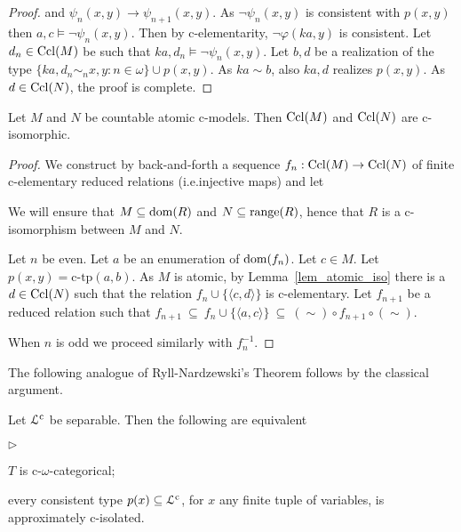 \documentclass{amsproc}
\newcommand{\mylabel}[1]{{#1}\hfill}
\renewenvironment{itemize}
  {\begin{list}{$\triangleright$}{%
  \setlength{\parskip}{0mm}
  \setlength{\topsep}{.4\baselineskip}
  \setlength{\rightmargin}{0mm}
  \setlength{\listparindent}{0mm}
  \setlength{\itemindent}{0mm}
  \setlength{\labelwidth}{3ex}
  \setlength{\itemsep}{.2\baselineskip}
  \setlength{\parsep}{.2\baselineskip}
  \setlength{\partopsep}{0mm}
  \setlength{\labelsep}{1ex}
  \setlength{\leftmargin}{\labelwidth+\labelsep}
  \let\makelabel\mylabel}}{%
\end{list}}
\begin{document}
{\begin{proof}
  
  and $\psi_n(x,y)\rightarrow\psi_{n+1}(x,y)$.
  As $\neg\psi_n(x,y)$ is consistent with $p(x,y)$ then $a,c\models\neg\psi_n(x,y)$.
  Then by c-elementarity, $\neg\varphi(ka,y)$ is consistent.
  Let $d_n\in{\rm Ccl}(M)$ be such that $ka,d_n\models\neg\psi_n(x,y)$.
  Let $b,d$ be a realization of the type $\{ka,d_n\sim_nx,y:n\in\omega\}\cup p(x,y)$.
  As $ka\sim b$, also $ka,d$ realizes $p(x,y)$.
  As $d\in{\rm Ccl}(N)$, the proof is complete.
\end{proof}

\begin{fact}\label{fact_atomic_iso}
  Let $M$ and $N$ be countable atomic c-models.
  Then ${\rm Ccl}(M)$ and ${\rm Ccl}(N)$ are c-isomorphic.
\end{fact}

\begin{proof}
  We construct by back-and-forth a sequence $f_n:{\rm Ccl}(M)\rightarrow{\rm Ccl}(N)$ of finite c-elementary reduced relations (i.e.\@ injective maps) and let 
  

  We will ensure that $M\subseteq{\rm dom}(R)$ and $N\subseteq{\rm range}(R)$, hence that $R$ is a c-isomorphism between $M$ and $N$.

  Let $n$ be even.
  Let $a$ be an enumeration of ${\rm dom}(f_n)$.
  Let $c\in M$.
  Let $p(x,y)=\mbox{c-tp}(a,b)$.
  As $M$ is atomic, by Lemma~\ref{lem_atomic_iso} there is a $d\in{\rm Ccl}(N)$ such that the relation $f_n\cup\{\langle c,d\rangle\}$ is c-elementary.
  Let $f_{n+1}$ be a reduced relation such that $f_{n+1}\ \subseteq\ f_n\cup\{\langle a,c\rangle\}\ \subseteq\ (\sim)\circ f_{n+1}\circ(\sim)$.

  When $n$ is odd we proceed similarly with $f_n^{-1}$.
\end{proof}

The following analogue of Ryll-Nardzewski's Theorem follows by the classical argument.

\begin{theorem}
  Let ${\EuScript L}^{\rm c}$ be separable.
  Then the following are equivalent
  \begin{itemize}
    \item[1.] $T$ is c-$\omega$-categorical;
    \item[2.] every consistent type $p(x)\subseteq{\EuScript L}^{\rm c}$, for $x$ any finite tuple of variables, is approximately c-isolated.
  \end{itemize}
\end{theorem}

}
\end{document}
